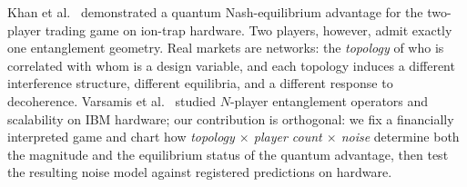 \documentclass[conference]{IEEEtran}
\begin{document}
Khan et al.~\cite{khan2025} demonstrated a quantum Nash-equilibrium advantage
for the two-player trading game on ion-trap hardware. Two players, however,
admit exactly one entanglement geometry. Real markets are networks: the
\emph{topology} of who is correlated with whom is a design variable, and each
topology induces a different interference structure, different equilibria, and
a different response to decoherence. Varsamis et al.~\cite{varsamis2025}
studied $N$-player entanglement operators and scalability on IBM hardware;
our contribution is orthogonal: we fix a financially interpreted game and
chart how \emph{topology $\times$ player count $\times$ noise} determine both
the magnitude and the equilibrium status of the quantum advantage, then test
the resulting noise model against registered predictions on hardware.
\end{document}
